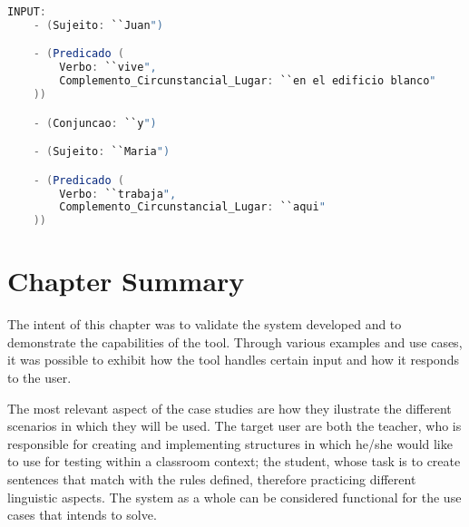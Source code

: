\begin{center}
\begin{minipage}{11cm}
\begin{lstlisting}[language=java, basicstyle=\tiny, label={lst:example_complex_input2}, caption=Example of a complex sentence input]
INPUT:
    - (Sujeito: ``Juan")

    - (Predicado (
        Verbo: ``vive",
        Complemento_Circunstancial_Lugar: ``en el edificio blanco"
    ))

    - (Conjuncao: ``y")

    - (Sujeito: ``Maria")

    - (Predicado (
        Verbo: ``trabaja",
        Complemento_Circunstancial_Lugar: ``aqui"
    ))
\end{lstlisting}
\end{minipage}
\end{center}

\section{Chapter Summary}

The intent of this chapter was to validate the system developed and to demonstrate the capabilities of the tool.
Through various examples and use cases, it was possible to exhibit how the tool handles certain input and how it responds to the user.

The most relevant aspect of the case studies are how they ilustrate the different scenarios in which they will be used.
The target user are both the teacher, who is responsible for creating and implementing structures in which he/she would like to use for testing within a classroom context;
the student, whose task is to create sentences that match with the rules defined, therefore practicing different linguistic aspects.
The system as a whole can be considered functional for the use cases that intends to solve.

